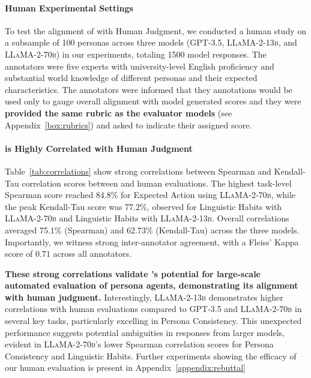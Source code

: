 \paragraph{Human Experimental Settings}
To test the alignment of \score with Human Judgment, we conducted a human study on a subsample of 100 personas across three models (\textsc{GPT-3.5}, \textsc{LLaMA-2-13b}, and \textsc{LLaMA-2-70b}) in our experiments, totaling 1500 model responses. The annotators were five experts with university-level English proficiency and substantial world knowledge of different personas and their expected characteristics. The annotators were informed that they annotations would be used only to gauge overall alignment with model generated scores and they were \textbf{provided the same rubric as the evaluator models} (see Appendix~\ref{box:rubrics}) and asked to indicate their assigned score. 

\paragraph{\score is Highly Correlated with Human Judgment} Table~\ref{tab:correlations} show strong correlations between Spearman and Kendall-Tau correlation scores between \score and human evaluations. 
The highest task-level Spearman score reached 84.8\% for Expected Action using \textsc{LLaMA-2-70b}, while the peak Kendall-Tau score was 77.2\%, observed for Linguistic Habits with \textsc{LLaMA-2-70b} and Linguistic Habits with \textsc{LLaMA-2-13b}. Overall \score correlations averaged 75.1\% (Spearman) and 62.73\% (Kendall-Tau) across the three models. 
Importantly, we witness strong inter-annotator agreement, with a Fleiss' Kappa score of $\mathbf{0.71}$ across all annotators.

\textbf{These strong correlations validate \benchmark's potential for large-scale automated evaluation of persona agents, demonstrating its alignment with human judgment.} Interestingly, \textsc{LLaMA-2-13b} demonstrates higher correlations with human evaluations compared to \textsc{GPT-3.5} and \textsc{LLaMA-2-70b} in several key tasks, particularly excelling in Persona Consistency. This unexpected performance suggests potential ambiguities in responses from larger models, evident in \textsc{LLaMA-2-70b}'s lower Spearman correlation scores for Persona Consistency and Linguistic Habits. Further experiments showing the efficacy of our human evaluation is present in Appendix~\ref{appendix:rebuttal}

